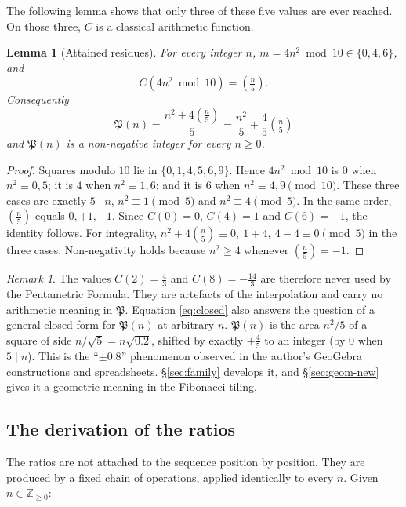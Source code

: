 \documentclass[11pt,a4paper]{article}
\newcommand{\Pent}{\mathfrak{P}}                      %
\newcommand{\leg}[1]{\left(\tfrac{#1}{5}\right)}      %
\newcommand{\Z}{\mathbb{Z}}
\theoremstyle{plain}
\newtheorem{lemma}[theorem]{Lemma}
\theoremstyle{definition}
\theoremstyle{remark}
\newtheorem{remark}[theorem]{Remark}
\begin{document}
The following lemma shows that only three of these five values are ever reached. On those three, $C$ is a classical arithmetic function.

\begin{lemma}[Attained residues]\label{lem:legendre}
For every integer $n$, $m=4n^{2}\bmod 10\in\{0,4,6\}$, and
\[
  C(4n^{2}\bmod 10)=\leg{n}.
\]
Consequently
\begin{equation}\label{eq:closed}
  \boxed{\;\Pent(n)=\frac{n^{2}+4\leg{n}}{5}=\frac{n^{2}}{5}+\frac45\leg{n}\;}
\end{equation}
and $\Pent(n)$ is a non-negative integer for every $n\ge0$.
\end{lemma}

\begin{proof}
Squares modulo $10$ lie in $\{0,1,4,5,6,9\}$. Hence $4n^{2}\bmod 10$ is $0$ when $n^{2}\equiv0,5$; it is $4$ when $n^{2}\equiv1,6$; and it is $6$ when $n^{2}\equiv4,9\pmod{10}$. These three cases are exactly $5\mid n$, $n^{2}\equiv1\pmod5$ and $n^{2}\equiv4\pmod5$. In the same order, $\leg{n}$ equals $0,+1,-1$. Since $C(0)=0$, $C(4)=1$ and $C(6)=-1$, the identity follows. For integrality, $n^{2}+4\leg{n}\equiv 0,\ 1+4,\ 4-4\equiv0\pmod 5$ in the three cases. Non-negativity holds because $n^{2}\ge4$ whenever $\leg{n}=-1$.
\end{proof}

\begin{remark}
The values $C(2)=\tfrac43$ and $C(8)=-\tfrac{14}{3}$ are therefore never used by the Pentametric Formula. They are artefacts of the interpolation and carry no arithmetic meaning in $\Pent$. Equation \eqref{eq:closed} also answers the question of a general closed form for $\Pent(n)$ at arbitrary $n$. $\Pent(n)$ is the area $n^{2}/5$ of a square of side $n/\sqrt5=n\sqrt{0.2}$, shifted by exactly $\pm\tfrac45$ to an integer (by $0$ when $5\mid n$). This is the “$\pm0.8$” phenomenon observed in the author's GeoGebra constructions and spreadsheets. §\ref{sec:family} develops it, and §\ref{sec:geom-new} gives it a geometric meaning in the Fibonacci tiling.
\end{remark}


\subsection{The derivation of the ratios}\label{sec:derivation}

The ratios are not attached to the sequence position by position. They are produced by a fixed chain of operations, applied identically to every $n$. Given $n\in\Z_{\ge0}$:
\end{document}
